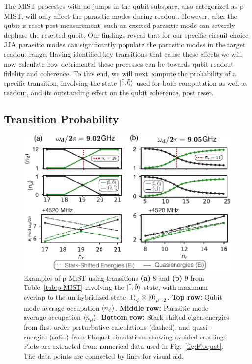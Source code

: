 \documentclass[%
reprint,
superscriptaddress,
 amsmath,amssymb,
 aps,
 prx,
longbibliography,
floatfix,
]{revtex4-2}
\begin{document}
The MIST processes with no jumps in the qubit subspace, also categorized as p-MIST, will only affect the parasitic modes during readout. However, after the qubit is reset post measurement, such an excited parasitic mode can severely dephase the resetted qubit. Our findings reveal that for our specific circuit choice JJA parasitic modes can significantly populate the parasitic modes in the target readout range. Having identified key transitions that cause these effects we will now calculate how detrimental these processes can be towards qubit readout fidelity and coherence. To this end, we will next compute the probability of a specific transition, involving the state $\ket{\tilde{1},\tilde{0}}$ used for both computation as well as readout, and its outstanding effect on the qubit coherence, post reset.

\subsection{Transition Probability}\label{sec:LZ}
 \begin{figure}[htb]
    \centering
    \includegraphics[width=\linewidth]{Figures/Floquet_011.pdf}
    \caption{Examples of p-MIST using transitions \textbf{(a)} $8$ and \textbf{(b)} $9$ from Table~\ref{tab:p-MIST} involving the $\ket{\tilde{1},\tilde{0}}$ state, with maximum overlap to the un-hybridized state $\ket{1}_\phi\otimes\ket{0}_{\mu=2}$. \textbf{Top row:} Qubit mode average occupation $\braket{n_\phi}$. \textbf{Middle row:} Parasitic mode average occupation $\braket{n_\mu}$. \textbf{Bottom row:} Stark-shifted eigen-energies from first-order perturbative calculations (dashed), and quasi-energies (solid) from Floquet simulations showing avoided crossings. Plots are extracted from numerical data used in Fig.~\ref{fig:Floquet}. The data points are connected by lines for visual aid.}
    \label{fig:011}
\end{figure}
\end{document}
